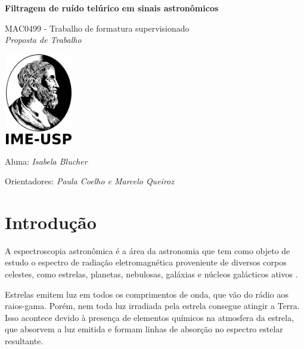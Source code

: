 \documentclass[11pt,twoside,a4paper]{article}
\begin{document}
\begin{center}
  \vspace*{3cm}
  
  \Huge
  \textbf{Filtragem de ruído telúrico em sinais astronômicos}

  \vspace{2.5cm}
  \LARGE
  MAC0499 - Trabalho de formatura supervisionado\\
  \vspace{0.3cm}
  \LARGE
  \textit{Proposta de Trabalho}

  
  \vspace{4.3cm}
  \includegraphics[height=4cm,width=3cm]{ime.png}
  \vspace{2cm}
  
  Aluna: \textit{Isabela Blucher}
  
  
  Orientadores: \textit{Paula Coelho e Marcelo Queiroz}
  
  \vspace{0.8cm}
  
  \Large
  
\end{center}


\newpage
\tableofcontents
\newpage
\section{Introdução}
\doublespacing


A espectroscopia astronômica é a área da astronomia que tem como objeto de estudo o espectro de radiação eletromagnética proveniente de diversos corpos celestes, como estrelas, planetas, nebulosas, galáxias e núcleos galácticos ativos \cite{wiki:astro_spectroscopy}. 

Estrelas emitem luz em todos os comprimentos de onda, que vão do rádio aos raios-gama. Porém, nem toda luz irradiada pela estrela consegue atingir a Terra. Isso acontece devido à presença de elementos químicos na atmosfera da estrela, que absorvem a luz emitida e formam linhas de absorção no espectro estelar resultante.
\end{document}
